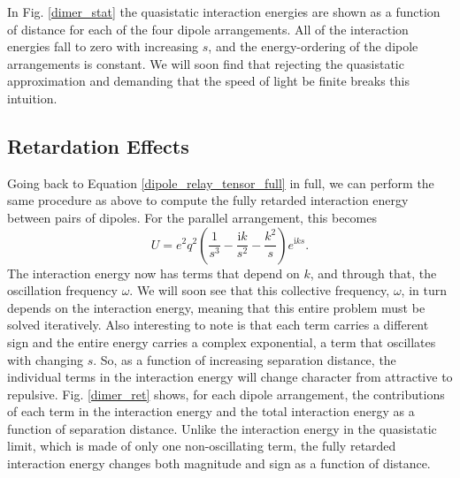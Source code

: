 \documentclass [11pt, proquest] {uwthesis}[2016/11/22]
\begin{document}
In Fig. \ref{dimer_stat} the quasistatic interaction energies are shown as a function of distance for each of the four dipole arrangements. All of the interaction energies fall to zero with increasing $s$, and the energy-ordering of the dipole arrangements is constant. We will soon find that rejecting the quasistatic approximation and demanding that the speed of light be finite breaks this intuition.

\subsection{Retardation Effects}

Going back to Equation \ref{dipole_relay_tensor_full} in full, we can perform the same procedure as above to compute the fully retarded interaction energy between pairs of dipoles. For the parallel arrangement, this becomes
\begin{equation}
U = e^2q^2\left(\frac{1}{s^3}-\frac{\textrm{i}k}{s^2}-\frac{k^2}{s}\right)e^{\textrm{i}ks}.
\label{int_ret}
\end{equation}
The interaction energy now has terms that depend on $k$, and through that, the oscillation frequency $\omega$. We will soon see that this collective frequency, $\omega$, in turn depends on the interaction energy, meaning that this entire problem must be solved iteratively. Also interesting to note is that each term carries a different sign and the entire energy carries a complex exponential, a term that oscillates with changing $s$. So, as a function of increasing separation distance, the individual terms in the interaction energy will change character from attractive to repulsive. Fig. \ref{dimer_ret} shows, for each dipole arrangement, the contributions of each term in the interaction energy and the total interaction energy as a function of separation distance. Unlike the interaction energy in the quasistatic limit, which is made of only one non-oscillating term, the fully retarded interaction energy changes both magnitude and sign as a function of distance.
\end{document}

